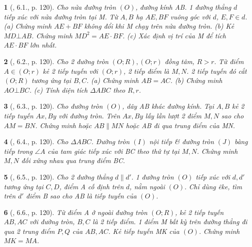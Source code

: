 \documentclass{article}
\newtheorem{baitoan}{}
\begin{document}
\begin{baitoan}[\cite{Binh_boi_duong_Toan_9_tap_1}, 6.1., p. 120]
	Cho nửa đường tròn $(O)$, đường kính AB. 1 đường thẳng $d$ tiếp xúc với nửa đường tròn tại M. Từ $A,B$ hạ $AE,BF$ vuông góc với $d$, $E,F\in d$. (a) Chứng minh $AE + BF$ không đổi khi M chạy trên nửa đường tròn. (b) Kẻ $MD\bot AB$. Chứng minh $MD^2 = AE\cdot BF$. (c) Xác định vị trí của M để tích $AE\cdot BF$ lớn nhất.
\end{baitoan}

\begin{baitoan}[\cite{Binh_boi_duong_Toan_9_tap_1}, 6.2., p. 120]
	Cho 2 đường tròn $(O;R),(O;r)$ đồng tâm, $R > r$. Từ điểm $A\in(O;r)$ kẻ 2 tiếp tuyến với $(O;r)$, 2 tiếp điểm là $M,N$. 2 tiếp tuyến đó cắt $(O;R)$ tương ứng tại $B,C$. (a) Chứng minh $AB = AC$. (b) Chứng minh $AO\bot BC$. (c) Tính diện tích $\Delta ABC$ theo $R,r$.
\end{baitoan}

\begin{baitoan}[\cite{Binh_boi_duong_Toan_9_tap_1}, 6.3., p. 120]
	Cho đường tròn $(O)$, dây AB khác đường kính. Tại $A,B$ kẻ 2 tiếp tuyến $Ax,By$ với đường tròn. Trên $Ax,By$ lấy lần lượt 2 điểm $M,N$ sao cho $AM = BN$. Chứng minh hoặc $AB\parallel MN$ hoặc AB đi qua trung điểm của MN.
\end{baitoan}

\begin{baitoan}[\cite{Binh_boi_duong_Toan_9_tap_1}, 6.4., p. 120]
	Cho $\Delta ABC$. Đường tròn $(I)$ nội tiếp \& đường tròn $(J)$ bàng tiếp trong $\angle{A}$ của tam giác tiếp xúc với BC theo thứ tự tại $M,N$. Chứng minh $M,N$ đối xứng nhau qua trung điểm BC.
\end{baitoan}

\begin{baitoan}[\cite{Binh_boi_duong_Toan_9_tap_1}, 6.5., p. 120]
	Cho 2 đường thẳng $d\parallel d'$. 1 đường tròn $(O)$ tiếp xúc với $d,d'$ tương ứng tại $C,D$, điểm A cố định trên $d$, nằm ngoài $(O)$. Chỉ dùng êke, tìm trên $d'$ điểm B sao cho AB là tiếp tuyến của $(O)$.
\end{baitoan}

\begin{baitoan}[\cite{Binh_boi_duong_Toan_9_tap_1}, 6.6., p. 120]
	Từ điểm A ở ngoài đường tròn $(O;R)$, kẻ 2 tiếp tuyến $AB,AC$ với đường tròn, $B,C$ là 2 tiếp điểm. 1 điểm M bất kỳ trên đường thẳng đi qua 2 trung điểm $P,Q$ của $AB,AC$. Kẻ tiếp tuyến MK của $(O)$. Chứng minh $MK = MA$.
\end{baitoan}
\end{document}
